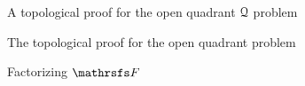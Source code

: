 \documentclass[11pt, a4paper, english, twoside, notitlepage, openright]{report}
\begin{document}
\begin{chapter}{A topological proof for the open quadrant $\mathcal{Q}$ problem}
\begin{section}{The topological proof for the open quadrant problem}
\begin{subsection}{Factorizing $\FFF$}

\end{subsection}
\end{section}
\end{chapter}
\end{document}
